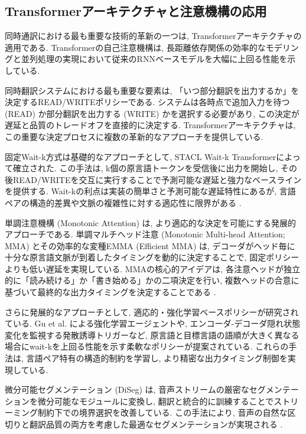 \subsection{Transformerアーキテクチャと注意機構の応用}

同時通訳における最も重要な技術的革新の一つは, Transformerアーキテクチャの適用である.
Transformerの自己注意機構は, 長距離依存関係の効率的なモデリングと並列処理の実現において従来のRNNベースモデルを大幅に上回る性能を示している.

同時翻訳システムにおける最も重要な要素は, 「いつ部分翻訳を出力するか」を決定するREAD/WRITEポリシーである.
システムは各時点で追加入力を待つ (READ) か部分翻訳を出力する (WRITE) かを選択する必要があり, この決定が遅延と品質のトレードオフを直接的に決定する.
Transformerアーキテクチャは, この重要な決定プロセスに複数の革新的なアプローチを提供している.

固定Wait-k方式は基礎的なアプローチとして, STACL Wait-k Transformerによって確立された.
この手法は, k個の原言語トークンを受信後に出力を開始し, その後READ/WRITEを交互に実行することで予測可能な遅延と強力なベースラインを提供する.
Wait-kの利点は実装の簡単さと予測可能な遅延特性にあるが, 言語ペアの構造的差異や文脈の複雑性に対する適応性に限界がある \cite{ma2019stacl}.

単調注意機構 (Monotonic Attention) は, より適応的な決定を可能にする発展的アプローチである.
単調マルチヘッド注意 (Monotonic Multi-head Attention; MMA) とその効率的な変種EMMA (Efficient MMA) は, デコーダがヘッド毎に十分な原言語文脈が到着したタイミングを動的に決定することで, 固定ポリシーよりも低い遅延を実現している.
MMAの核心的アイデアは, 各注意ヘッドが独立的に「読み続ける」か「書き始める」かの二項決定を行い, 複数ヘッドの合意に基づいて最終的な出力タイミングを決定することである \cite{ma2020monotonic,ma2023efficient}.

さらに発展的なアプローチとして, 適応的・強化学習ベースポリシーが研究されている.
Gu et al. \cite{gu2017learning} による強化学習エージェントや, エンコーダ-デコーダ隠れ状態変化を監視する発散誘導トリガーなど, 原言語と目標言語の語順が大きく異なる場合にwait-kを上回る性能を示す柔軟なポリシーが提案されている.
これらの手法は, 言語ペア特有の構造的制約を学習し, より精密な出力タイミング制御を実現している.

微分可能セグメンテーション (DiSeg) は, 音声ストリームの厳密なセグメンテーションを微分可能なモジュールに変換し, 翻訳と統合的に訓練することでストリーミング制約下での境界選択を改善している.
この手法により, 音声の自然な区切りと翻訳品質の両方を考慮した最適なセグメンテーションが実現される \cite{zhang2023diseg}.

